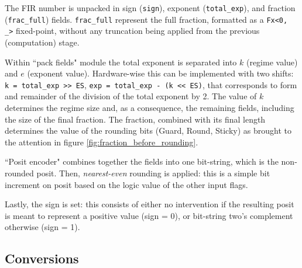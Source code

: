The FIR number is unpacked in sign (\texttt{sign}), exponent (\texttt{total\_exp}), and fraction (\texttt{frac\_full}) fields.
\texttt{frac\_full} represent the full fraction, formatted as a \texttt{Fx<0, \_>} fixed-point, without any truncation being applied from the previous (computation) stage.

Within ``pack fields" module the total exponent is separated into $k$ (regime value) and $e$ (exponent value). Hardware-wise this can be implemented with two shifts: \texttt{k = total\_exp >> ES}, \texttt{exp = total\_exp - (k << ES)}, that corresponds to form and remainder of the division of the total exponent by 2.
The value of $k$ determines the regime size and, as a consequence, the remaining fields, including the size of the final fraction. 
The fraction, combined with its final length determines the value of the rounding bits (Guard, Round, Sticky) as brought to the attention in figure \ref{fig:fraction_before_rounding}.

``Posit encoder" combines together the fields into one bit-string, which is the non-rounded posit.
Then, \textit{nearest-even} rounding is applied: this is a simple bit increment on posit based on the logic value of the other input flags.

Lastly, the sign is set: this consists of either no intervention if the resulting posit is meant to represent a positive value (sign = 0), or bit-string two's complement otherwise (sign = 1).



\subsection{Conversions}







